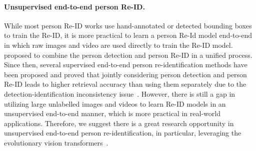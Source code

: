 \documentclass[a4paper,fleqn]{cas-dc}
\begin{document}
\paragraph{Unsupervised end-to-end person Re-ID.}While most person Re-ID works use hand-annotated or detected bounding boxes to train the Re-ID, it is more practical to learn a person Re-Id model end-to-end in which raw images and video are used directly to train the Re-ID model. ~\cite{xu_person_2014} proposed to combine the person detection and person Re-ID in a unified process. Since then, several supervised end-to-end person re-identification methods have been proposed and proved that jointly considering person detection and person Re-ID leads to higher retrieval accuracy than using them separately due to the detection-identification inconsistency issue~\cite{ijcai2021-613}. However, there is still a gap in utilizing large unlabelled images and videos to learn Re-ID models in an unsupervised end-to-end manner, which is more practical in real-world applications. Therefore, we suggest there is a great research opportunity in unsupervised end-to-end person re-identification, in particular, leveraging the evolutionary vision transformers~\cite{khan_transformers_2021,10.1007/978-3-030-58452-8_13,nguyen_clusformer_2021,liu_swin_2021}.
\end{document}
